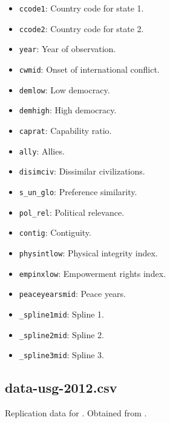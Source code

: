 \documentclass[12pt]{article}
\begin{document}
\begin{itemize}
  \item \texttt{ccode1}: Country code for state 1.
  \item \texttt{ccode2}: Country code for state 2.
  \item \texttt{year}: Year of observation.
  \item \texttt{cwmid}: Onset of international conflict.
  \item \texttt{demlow}: Low democracy.
  \item \texttt{demhigh}: High democracy.
  \item \texttt{caprat}: Capability ratio.
  \item \texttt{ally}: Allies.
  \item \texttt{disimciv}: Dissimilar civilizations.
  \item \texttt{s\_un\_glo}: Preference similarity.
  \item \texttt{pol\_rel}: Political relevance.
  \item \texttt{contig}: Contiguity.
  \item \texttt{physintlow}: Physical integrity index.
  \item \texttt{empinxlow}: Empowerment rights index.
  \item \texttt{peaceyearsmid}: Peace years.
  \item \texttt{\_spline1mid}: Spline 1.
  \item \texttt{\_spline2mid}: Spline 2.
  \item \texttt{\_spline3mid}: Spline 3.
\end{itemize}

\subsection{data-usg-2012.csv}

Replication data for \citet{Uzonyi:2012im}.
Obtained from \citet{uzonyi2012data}.
\end{document}
